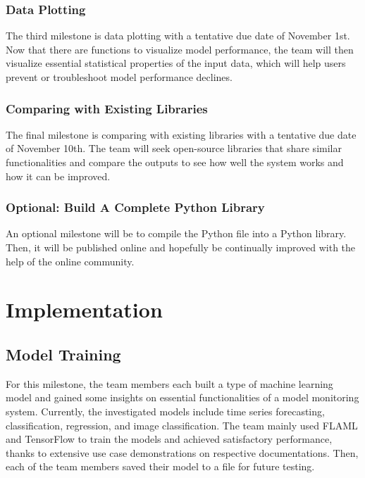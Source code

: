 \documentclass[
	letterpaper, %
	12pt, %
]{CSUniSchoolLabReport}
\begin{document}
\subsubsection{Data Plotting}

The third milestone is data plotting with a tentative due date of November 1st. Now that there are functions to visualize model performance, the team will then visualize essential statistical properties of the input data, which will help users prevent or troubleshoot model performance declines. 

\subsubsection{Comparing with Existing Libraries}

The final milestone is comparing with existing libraries with a tentative due date of November 10th. The team will seek open-source libraries that share similar functionalities and compare the outputs to see how well the system works and how it can be improved.

\subsubsection{Optional: Build A Complete Python Library}

An optional milestone will be to compile the Python file into a Python library. Then, it will be published online and hopefully be continually improved with the help of the online community.


\section{Implementation}
\subsection{Model Training}
For this milestone, the team members each built a type of machine learning model and gained some insights on essential functionalities of a model monitoring system. Currently, the investigated models include time series forecasting, classification, regression, and image classification. The team mainly used FLAML and TensorFlow to train the models and achieved satisfactory performance, thanks to extensive use case demonstrations on respective documentations. Then, each of the team members saved their model to a file for future testing. \par
\end{document}
